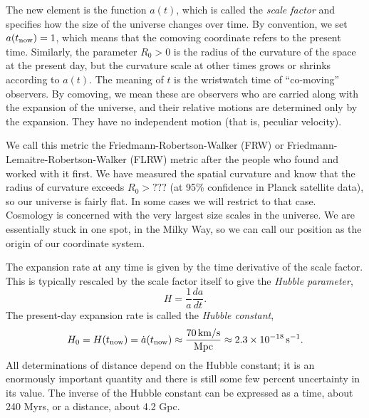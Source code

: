 The new element is the function $a(t)$, which is called the \textit{scale factor} and specifies how the size of the universe changes over time.  By convention, we set $a(t_{\rm now}) = 1$, which means that the comoving coordinate refers to the present time. Similarly, the parameter $R_0 > 0$ is the radius of the curvature of the space at the present day, but the curvature scale at other times grows or shrinks according to $a(t)$.  The meaning of $t$ is the wristwatch time of ``co-moving'' observers.  By comoving, we mean these are observers who are carried along with the expansion of the universe, and their relative motions are determined only by the expansion.  They have no independent motion (that is, peculiar velocity).

We call this metric the Friedmann-Robertson-Walker (FRW) or Friedmann-Lemaitre-Robertson-Walker (FLRW) metric after the people who found and worked with it first.  We have measured the spatial curvature and know that the radius of curvature exceeds $R_0 > ???$ (at 95\% confidence in Planck satellite data), so our universe is fairly flat.  In some cases we will restrict to that case.  Cosmology is concerned with the very largest size scales in the universe.  We are essentially stuck in one spot, in the Milky Way, so we can call our position as the origin of our coordinate system. 

The expansion rate at any time is given by the time derivative of the scale factor.  This is typically rescaled by the scale factor itself to give the \textit{Hubble parameter},
\begin{equation}
  H = \frac{1}{a} \frac{da}{dt}. 
\end{equation}
The present-day expansion rate is called the \textit{Hubble constant},
\begin{equation}
  H_0 = H(t_{\rm now}) = \dot a(t_{\rm now}) \approx \frac{70\,\mbox{km/s}}{\mbox{Mpc}} \approx 2.3\times 10^{-18}\,\mbox{s}^{-1}.
\end{equation}
All determinations of distance depend on the Hubble constant; it is an enormously important quantity and there is still some few percent uncertainty in its value.  The inverse of the Hubble constant can be expressed as a time, about 240 Myrs, or a distance, about 4.2 Gpc.
  
